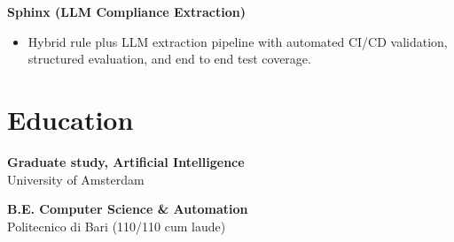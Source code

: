 \documentclass[a4paper,10pt]{article}
\begin{document}
\vspace{4pt}
\textbf{Sphinx (LLM Compliance Extraction)}
\begin{itemize}
    \item Hybrid rule plus LLM extraction pipeline with automated CI/CD validation, structured evaluation, and end to end test coverage.
\end{itemize}

\section*{Education}

\textbf{Graduate study, Artificial Intelligence} \\
University of Amsterdam

\vspace{4pt}
\textbf{B.E. Computer Science \& Automation} \\
Politecnico di Bari (110/110 cum laude)
\end{document}
